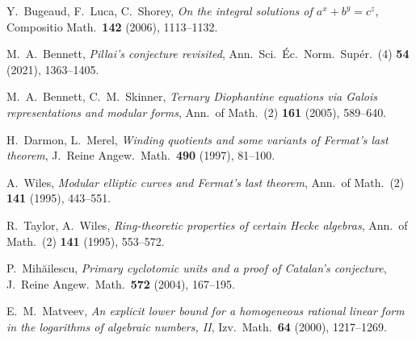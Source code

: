 \documentclass{article}
\begin{document}
\begin{thebibliography}{99}

Y.~Bugeaud, F.~Luca, C.~Shorey,
\emph{On the integral solutions of $a^{x}+b^{y}=c^{z}$},
Compositio Math.\ \textbf{142} (2006), 1113–1132.

M.~A.~Bennett,
\emph{Pillai’s conjecture revisited},
Ann.\ Sci.\ Éc.\ Norm.\ Supér.\ (4) \textbf{54} (2021), 1363–1405.

M.~A.~Bennett, C.~M.~Skinner,
\emph{Ternary Diophantine equations via Galois representations and modular forms},
Ann.\ of Math.\ (2) \textbf{161} (2005), 589–640.

H.~Darmon, L.~Merel,
\emph{Winding quotients and some variants of Fermat’s last theorem},
J.\ Reine Angew.\ Math.\ \textbf{490} (1997), 81–100.

A.~Wiles,
\emph{Modular elliptic curves and Fermat’s last theorem},
Ann.\ of Math.\ (2) \textbf{141} (1995), 443–551.

R.~Taylor, A.~Wiles,
\emph{Ring-theoretic properties of certain Hecke algebras},
Ann.\ of Math.\ (2) \textbf{141} (1995), 553–572.

P.~Mihăilescu,
\emph{Primary cyclotomic units and a proof of Catalan’s conjecture},
J.\ Reine Angew.\ Math.\ \textbf{572} (2004), 167–195.

E.~M.~Matveev,
\emph{An explicit lower bound for a homogeneous rational linear form in the logarithms of algebraic numbers, II},
Izv.\ Math.\ \textbf{64} (2000), 1217–1269.

\end{thebibliography}
\end{document}
